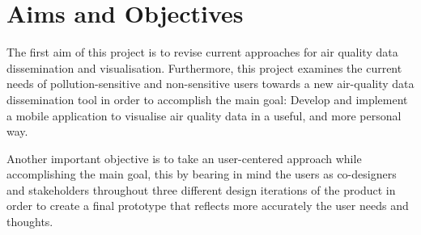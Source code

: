 \section{Aims and Objectives}
The first aim of this project is to revise current approaches for air quality data dissemination and visualisation. Furthermore, this project examines the current needs of pollution-sensitive and non-sensitive users towards a new air-quality data dissemination tool in order to accomplish the main goal: Develop and implement a mobile application to visualise air quality data in a useful, and more personal way. 

Another important objective is to take an user-centered approach while accomplishing the main goal, this by bearing in mind the users as co-designers and stakeholders throughout three different design iterations of the product in order to create a final prototype that reflects more accurately the user needs and thoughts.

\iffalse
DATA -> APP -> USEFUL -> PERSONAL -> DECISION SUPPORT -> DESIGNED BY PEOPLE
\fi